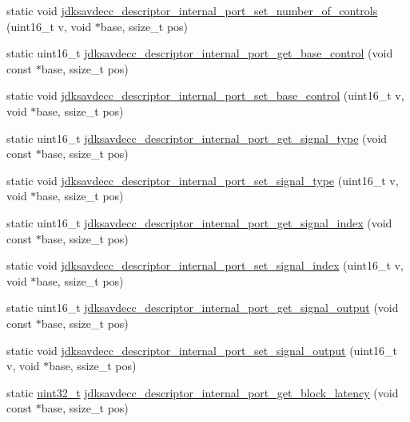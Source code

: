 \begin{DoxyCompactItemize}
\item 
static void \hyperlink{group__descriptor__internal__port_ga92289cae4a94553e8c4573d42e4ff9d1}{jdksavdecc\+\_\+descriptor\+\_\+internal\+\_\+port\+\_\+set\+\_\+number\+\_\+of\+\_\+controls} (uint16\+\_\+t v, void $\ast$base, ssize\+\_\+t pos)
\item 
static uint16\+\_\+t \hyperlink{group__descriptor__internal__port_gafcb5b5c708503347ab874677759ad7ad}{jdksavdecc\+\_\+descriptor\+\_\+internal\+\_\+port\+\_\+get\+\_\+base\+\_\+control} (void const $\ast$base, ssize\+\_\+t pos)
\item 
static void \hyperlink{group__descriptor__internal__port_ga6ec8e8f90851221be130e3532c4c4ec5}{jdksavdecc\+\_\+descriptor\+\_\+internal\+\_\+port\+\_\+set\+\_\+base\+\_\+control} (uint16\+\_\+t v, void $\ast$base, ssize\+\_\+t pos)
\item 
static uint16\+\_\+t \hyperlink{group__descriptor__internal__port_gae6f4e14e3512a29342eda896d7f4bade}{jdksavdecc\+\_\+descriptor\+\_\+internal\+\_\+port\+\_\+get\+\_\+signal\+\_\+type} (void const $\ast$base, ssize\+\_\+t pos)
\item 
static void \hyperlink{group__descriptor__internal__port_ga5f0e2281c329c3c41d540cb80539c3d9}{jdksavdecc\+\_\+descriptor\+\_\+internal\+\_\+port\+\_\+set\+\_\+signal\+\_\+type} (uint16\+\_\+t v, void $\ast$base, ssize\+\_\+t pos)
\item 
static uint16\+\_\+t \hyperlink{group__descriptor__internal__port_ga12f6a3263de953390c8fd0bcd4d6c951}{jdksavdecc\+\_\+descriptor\+\_\+internal\+\_\+port\+\_\+get\+\_\+signal\+\_\+index} (void const $\ast$base, ssize\+\_\+t pos)
\item 
static void \hyperlink{group__descriptor__internal__port_gaf617eb6a3a3777873effb6ae59f82e07}{jdksavdecc\+\_\+descriptor\+\_\+internal\+\_\+port\+\_\+set\+\_\+signal\+\_\+index} (uint16\+\_\+t v, void $\ast$base, ssize\+\_\+t pos)
\item 
static uint16\+\_\+t \hyperlink{group__descriptor__internal__port_ga8a1112b1d21e734475a457d5a3d65f50}{jdksavdecc\+\_\+descriptor\+\_\+internal\+\_\+port\+\_\+get\+\_\+signal\+\_\+output} (void const $\ast$base, ssize\+\_\+t pos)
\item 
static void \hyperlink{group__descriptor__internal__port_ga135b05de8c567e00b1f662cf8204fa6a}{jdksavdecc\+\_\+descriptor\+\_\+internal\+\_\+port\+\_\+set\+\_\+signal\+\_\+output} (uint16\+\_\+t v, void $\ast$base, ssize\+\_\+t pos)
\item 
static \hyperlink{parse_8c_a6eb1e68cc391dd753bc8ce896dbb8315}{uint32\+\_\+t} \hyperlink{group__descriptor__internal__port_gaa85d65e354a30fab5fe1d7fe022cc920}{jdksavdecc\+\_\+descriptor\+\_\+internal\+\_\+port\+\_\+get\+\_\+block\+\_\+latency} (void const $\ast$base, ssize\+\_\+t pos)

\end{DoxyCompactItemize}

